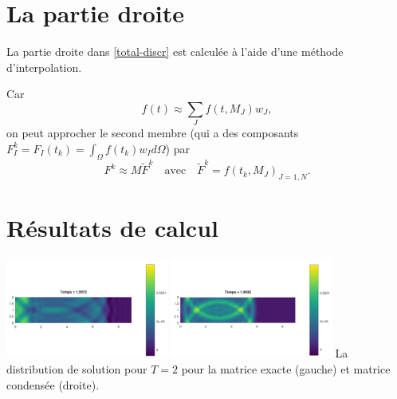 \documentclass[12pt]{article}
\begin{document}
	\section{La partie droite}
	La partie droite dans \eqref{total-discr} est calculée à l'aide d'une méthode d'interpolation.
	
	Car
	\begin{equation*}
	f(t) \approx \sum_{J} f(t,M_J)w_J,
	\end{equation*}
	on peut approcher le second membre (qui a des composants $F^k_I = F_I(t_k) = \int_\Omega f(t_k) w_I d\Omega$) par
	\begin{equation*}
	F^k \approx M\tilde{F}^k \quad \text{avec} \quad \tilde{F}^k = f(t_k,M_J)_{J=1,N}.
	\end{equation*}
\section{Résultats de calcul }
\begin{center}
	\hspace{1cm}\includegraphics[width=0.4\textwidth]{images/T2.png}\hspace{1cm}
	\includegraphics[width=0.4\textwidth]{images/Tcond2.png}\hspace{1cm}
	{La distribution de solution pour $T = 2$ pour la matrice exacte (gauche) et matrice condensée (droite)}.
\end{center}
\end{document}

